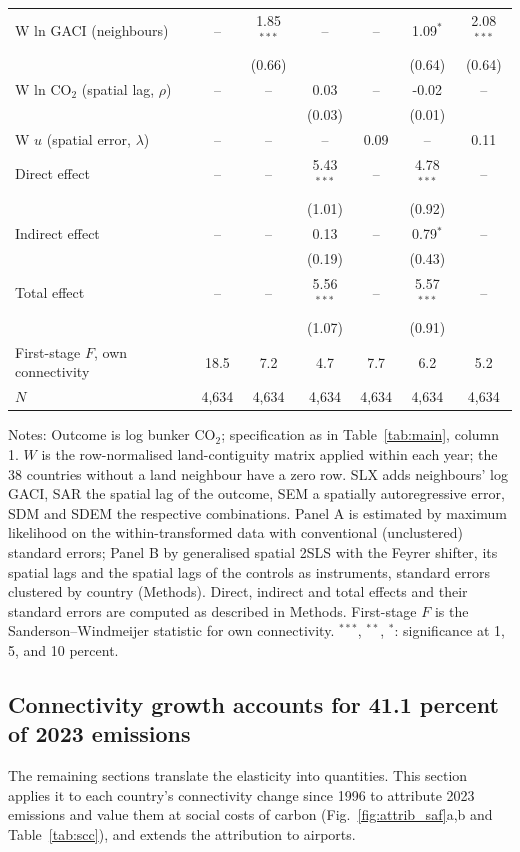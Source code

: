 \documentclass[12pt]{extarticle}
\begin{document}
\begin{table}[H]
{\begin{threeparttable}
\begin{tabular}{lcccccc}
  W ln GACI (neighbours) & -- & 1.85$^{***}$ & -- & -- & 1.09$^{*}$ & 2.08$^{***}$ \\
   &  & (0.66) &  &  & (0.64) & (0.64) \\
  W ln CO$_2$ (spatial lag, $\rho$) & -- & -- & 0.03 & -- & -0.02 & -- \\
   &  &  & (0.03) &  & (0.01) &  \\
  W $u$ (spatial error, $\lambda$) & -- & -- & -- & 0.09 & -- & 0.11 \\
  Direct effect & -- & -- & 5.43$^{***}$ & -- & 4.78$^{***}$ & -- \\
   &  &  & (1.01) &  & (0.92) &  \\
  Indirect effect & -- & -- & 0.13 & -- & 0.79$^{*}$ & -- \\
   &  &  & (0.19) &  & (0.43) &  \\
  Total effect & -- & -- & 5.56$^{***}$ & -- & 5.57$^{***}$ & -- \\
   &  &  & (1.07) &  & (0.91) &  \\
  First-stage $F$, own connectivity & 18.5 & 7.2 & 4.7 & 7.7 & 6.2 & 5.2 \\
  $N$ & 4,634 & 4,634 & 4,634 & 4,634 & 4,634 & 4,634 \\
\bottomrule
\end{tabular}
\begin{tablenotes}[flushleft]
\footnotesize
\item Notes: Outcome is log bunker CO$_2$; specification as in Table~\ref{tab:main}, column 1. $W$ is the row-normalised land-contiguity matrix applied within each year; the 38 countries without a land neighbour have a zero row. SLX adds neighbours' log GACI, SAR the spatial lag of the outcome, SEM a spatially autoregressive error, SDM and SDEM the respective combinations. Panel A is estimated by maximum likelihood on the within-transformed data with conventional (unclustered) standard errors; Panel B by generalised spatial 2SLS with the Feyrer shifter, its spatial lags and the spatial lags of the controls as instruments, standard errors clustered by country (Methods). Direct, indirect and total effects and their standard errors are computed as described in Methods. First-stage $F$ is the Sanderson--Windmeijer statistic for own connectivity. $^{***}$, $^{**}$, $^{*}$: significance at 1, 5, and 10 percent.
\end{tablenotes}
\end{threeparttable}}
\end{table}

\subsection*{Connectivity growth accounts for 41.1 percent of 2023
emissions}
The remaining sections translate the elasticity into quantities. This
section applies it to each country's connectivity change since 1996 to
attribute 2023 emissions and value them at social costs of carbon
(Fig.~\ref{fig:attrib_saf}a,b and Table~\ref{tab:scc}), and extends the
attribution to airports.
\end{document}
